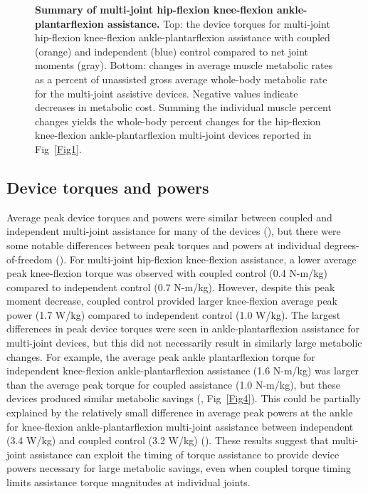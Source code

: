 \documentclass[10pt,letterpaper]{article}
\begin{document}
\begin{figure}[!h]
\begin{adjustwidth}{-1in}{0in} %
    \centering
    \caption{{\bf Summary of multi-joint hip-flexion knee-flexion ankle-plantarflexion assistance.}
        Top: the device torques for multi-joint hip-flexion knee-flexion ankle-plantarflexion assistance with coupled (orange) and independent (blue) control compared to net joint moments (gray). Bottom: changes in average muscle metabolic rates as a percent of unassisted gross average whole-body metabolic rate for the multi-joint assistive devices. Negative values indicate decreases in metabolic cost. Summing the individual muscle percent changes yields the whole-body percent changes for the hip-flexion knee-flexion ankle-plantarflexion multi-joint devices reported in Fig~\ref{Fig1}.}
\label{Fig6}
\end{adjustwidth}
\end{figure}

\subsection*{Device torques and powers}
Average peak device torques and powers were similar between coupled and independent multi-joint assistance for many of the devices (), but there were some notable differences between peak torques and powers at individual degrees-of-freedom (). For multi-joint hip-flexion knee-flexion assistance, a lower average peak knee-flexion torque was observed with coupled control (0.4 N-m/kg) compared to independent control (0.7 N-m/kg). However, despite this peak moment decrease, coupled control provided larger knee-flexion average peak power (1.7 W/kg) compared to independent control (1.0 W/kg). The largest differences in peak device torques were seen in ankle-plantarflexion assistance for multi-joint devices, but this did not necessarily result in similarly large metabolic changes. For example, the average peak ankle plantarflexion torque for independent knee-flexion ankle-plantarflexion assistance (1.6 N-m/kg) was larger than the average peak torque for coupled assistance (1.0 N-m/kg), but these devices produced similar metabolic savings (, Fig~\ref{Fig4}). This could be partially explained by the relatively small difference in average peak powers at the ankle for knee-flexion ankle-plantarflexion multi-joint assistance between independent (3.4 W/kg) and coupled control (3.2 W/kg) (). These results suggest that multi-joint assistance can exploit the timing of torque assistance to provide device powers necessary for large metabolic savings, even when coupled torque timing limits assistance torque magnitudes at individual joints.
\end{document}
